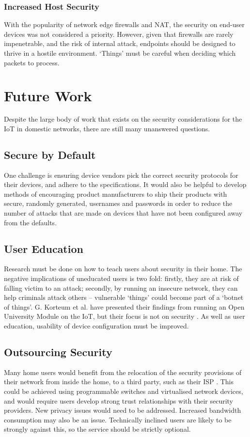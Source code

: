 \documentclass[10pt,journal,compsoc]{IEEEtran}
\begin{document}
\subsubsection{Increased Host Security}
With the popularity of network edge firewalls and NAT, the security on end-user
devices was not considered a priority. However, given that firewalls are rarely
impenetrable, and the risk of internal attack, endpoints should be designed to
thrive in a hostile environment. `Things' must be careful when deciding which
packets to process.


\section{Future Work}
Despite the large body of work that exists on the security considerations for
the IoT in domestic networks, there are still many unanswered questions. 

\subsection{Secure by Default}
One challenge is ensuring device vendors pick the correct security protocols
for their devices, and adhere to the specifications. It would also be helpful
to develop methods of encouraging product manufacturers to ship their products
with secure, randomly generated, usernames and passwords in order to reduce the
number of attacks that are made on devices that have not been configured away
from the defaults.

\subsection{User Education}
Research must be done on how to teach users about security in their home. The
negative implications of uneducated users is two fold: firstly, they are at
risk of falling victim to an attack; secondly, by running an insecure network,
they can help criminals attack others -- vulnerable `things' could become part
of a `botnet of things'. G. Korteum et al. have presented their findings from
running an Open University Module on the IoT, but their focus is not on
security \cite{Kortuem2013}. As well as user education, usability of device
configuration must be improved. 

\subsection{Outsourcing Security}
Many home users would benefit from the relocation of the security provisions of
their network from inside the home, to a third party, such as their ISP
\cite{Kritzinger2013}. This could be achieved using programmable switches and
virtualised network devices, and would require users develop strong trust
relationships with their security providers. New privacy issues would need to
be addressed. Increased bandwidth consumption may also be an issue. Technically
inclined users are likely to be strongly against this, so the service should
be strictly optional.
\end{document}
